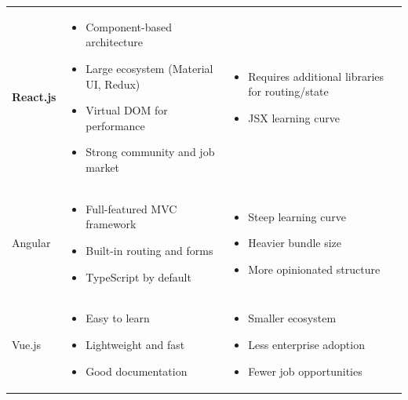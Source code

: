 \documentclass[a4paper]{article}
\begin{document}
\begin{longtable}{@{}
    >{\raggedright\arraybackslash}p{}
    >{\raggedright\arraybackslash}p{}
    >{\raggedright\arraybackslash}p{} @{}}
    \textbf{React.js} & 
    \begin{itemize}[leftmargin=*, nosep, topsep=0pt]
        \item Component-based architecture
        \item Large ecosystem (Material UI, Redux)
        \item Virtual DOM for performance
        \item Strong community and job market
    \end{itemize} & 
    \begin{itemize}[leftmargin=*, nosep, topsep=0pt]
        \item Requires additional libraries for routing/state
        \item JSX learning curve
    \end{itemize} \\
    \addlinespace
    \midrule
    \addlinespace
    Angular & 
    \begin{itemize}[leftmargin=*, nosep, topsep=0pt]
        \item Full-featured MVC framework
        \item Built-in routing and forms
        \item TypeScript by default
    \end{itemize} & 
    \begin{itemize}[leftmargin=*, nosep, topsep=0pt]
        \item Steep learning curve
        \item Heavier bundle size
        \item More opinionated structure
    \end{itemize} \\
    \addlinespace
    \midrule
    \addlinespace
    Vue.js & 
    \begin{itemize}[leftmargin=*, nosep, topsep=0pt]
        \item Easy to learn
        \item Lightweight and fast
        \item Good documentation
    \end{itemize} & 
    \begin{itemize}[leftmargin=*, nosep, topsep=0pt]
        \item Smaller ecosystem
        \item Less enterprise adoption
        \item Fewer job opportunities
    \end{itemize} \\
\end{longtable}
\end{document}
